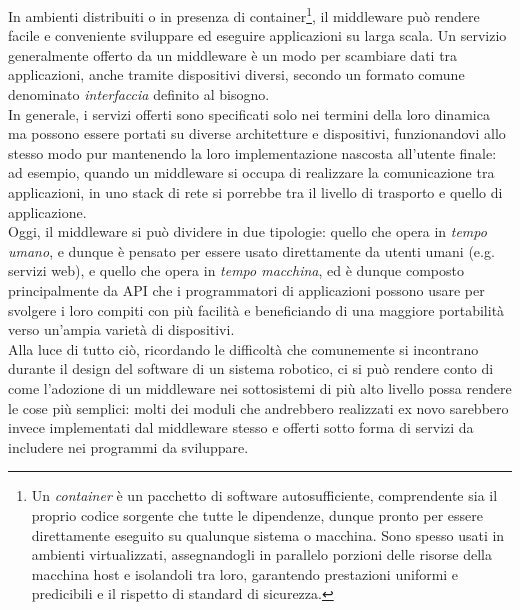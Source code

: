 In ambienti distribuiti o in presenza di container\footnote{Un \emph{container} è un pacchetto di software autosufficiente, comprendente sia il proprio codice sorgente che tutte le dipendenze, dunque pronto per essere direttamente eseguito su qualunque sistema o macchina. Sono spesso usati in ambienti virtualizzati, assegnandogli in parallelo porzioni delle risorse della macchina host e isolandoli tra loro, garantendo prestazioni uniformi e predicibili e il rispetto di standard di sicurezza.}, il middleware può rendere facile e conveniente sviluppare ed eseguire applicazioni su larga scala. Un servizio generalmente offerto da un middleware è un modo per scambiare dati tra applicazioni, anche tramite dispositivi diversi, secondo un formato comune denominato \emph{interfaccia} definito al bisogno.\\
In generale, i servizi offerti sono specificati solo nei termini della loro dinamica ma possono essere portati su diverse architetture e dispositivi, funzionandovi allo stesso modo pur mantenendo la loro implementazione nascosta all’utente finale: ad esempio, quando un middleware si occupa di realizzare la comunicazione tra applicazioni, in uno stack di rete si porrebbe tra il livello di trasporto e quello di applicazione.\\
Oggi, il middleware si può dividere in due tipologie: quello che opera in \emph{tempo umano}, e dunque è pensato per essere usato direttamente da utenti umani (e.g. servizi web), e quello che opera in \emph{tempo macchina}, ed è dunque composto principalmente da API che i programmatori di applicazioni possono usare per svolgere i loro compiti con più facilità e beneficiando di una maggiore portabilità verso un'ampia varietà di dispositivi.\\
Alla luce di tutto ciò, ricordando le difficoltà che comunemente si incontrano durante il design del software di un sistema robotico, ci si può rendere conto di come l'adozione di un middleware nei sottosistemi di più alto livello possa rendere le cose più semplici: molti dei moduli che andrebbero realizzati ex novo sarebbero invece implementati dal middleware stesso e offerti sotto forma di servizi da includere nei programmi da sviluppare.

